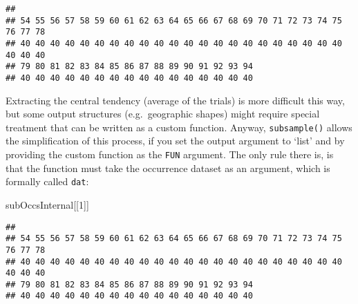 \documentclass[]{article}
\newenvironment{Shaded}{\begin{snugshade}}{\end{snugshade}}
\newcommand{\ControlFlowTok}[1]{\textcolor[rgb]{0.13,0.29,0.53}{\textbf{#1}}}
\newcommand{\DataTypeTok}[1]{\textcolor[rgb]{0.13,0.29,0.53}{#1}}
\newcommand{\DecValTok}[1]{\textcolor[rgb]{0.00,0.00,0.81}{#1}}
\newcommand{\KeywordTok}[1]{\textcolor[rgb]{0.13,0.29,0.53}{\textbf{#1}}}
\newcommand{\NormalTok}[1]{#1}
\newcommand{\OperatorTok}[1]{\textcolor[rgb]{0.81,0.36,0.00}{\textbf{#1}}}
\newcommand{\StringTok}[1]{\textcolor[rgb]{0.31,0.60,0.02}{#1}}
\begin{document}
\begin{verbatim}
## 
## 54 55 56 57 58 59 60 61 62 63 64 65 66 67 68 69 70 71 72 73 74 75 76 77 78 
## 40 40 40 40 40 40 40 40 40 40 40 40 40 40 40 40 40 40 40 40 40 40 40 40 40 
## 79 80 81 82 83 84 85 86 87 88 89 90 91 92 93 94 
## 40 40 40 40 40 40 40 40 40 40 40 40 40 40 40 40
\end{verbatim}

Extracting the central tendency (average of the trials) is more
difficult this way, but some output structures (e.g.~geographic shapes)
might require special treatment that can be written as a custom
function. Anyway, \texttt{subsample()} allows the simplification of this
process, if you set the output argument to `list' and by providing the
custom function as the \texttt{FUN} argument. The only rule there is, is
that the function must take the occurrence dataset as an argument, which
is formally called \texttt{dat}:

\begin{Shaded}
\end{Shaded}

\begin{Shaded}
\begin{Highlighting}[]
\NormalTok{subOccsInternal[[}\DecValTok{1}\NormalTok{]]}
\end{Highlighting}
\end{Shaded}

\begin{verbatim}
## 
## 54 55 56 57 58 59 60 61 62 63 64 65 66 67 68 69 70 71 72 73 74 75 76 77 78 
## 40 40 40 40 40 40 40 40 40 40 40 40 40 40 40 40 40 40 40 40 40 40 40 40 40 
## 79 80 81 82 83 84 85 86 87 88 89 90 91 92 93 94 
## 40 40 40 40 40 40 40 40 40 40 40 40 40 40 40 40
\end{verbatim}
\end{document}
